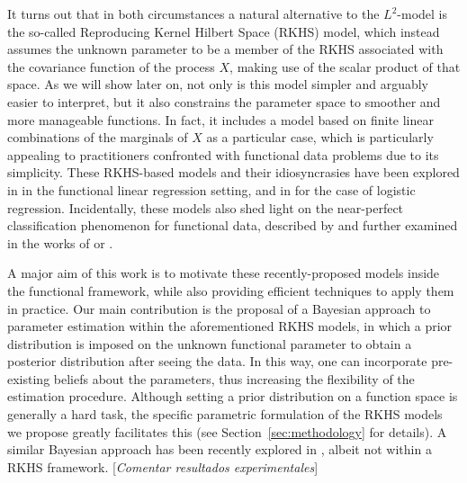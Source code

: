 \documentclass[ba]{imsart}
\numberwithin{equation}{section}
\theoremstyle{plain}
\newcommand\incomment[2][comment-red]{\color{#1}[\textit{#2}]\color{black}}
\begin{document}
It turns out that in both circumstances a natural alternative to the \(L^2\)-model is the so-called Reproducing Kernel Hilbert Space (RKHS) model, which instead assumes the unknown parameter to be a member of the RKHS associated with the covariance function of the process \(X\), making use of the scalar product of that space. As we will show later on, not only is this model simpler and arguably easier to interpret, but it also constrains the parameter space to smoother and more manageable functions. In fact, it includes a model based on finite linear combinations of the marginals of \(X\) as a particular case, which is particularly appealing to practitioners confronted with functional data problems due to its simplicity. These RKHS-based models and their idiosyncrasies have been explored in \citet{berrendero2019rkhs, berrendero2020general} in the functional linear regression setting, and in \citet{berrendero2018use, berrendero2021functional} for the case of logistic regression. Incidentally, these models also shed light on the near-perfect classification phenomenon for functional data, described by \citet{delaigle2012achieving} and further examined in the works of \citet{berrendero2018use} or \citet{torrecilla2020optimal}.

A major aim of this work is to motivate these recently-proposed models inside the functional framework, while also providing efficient techniques to apply them in practice. Our main contribution is the proposal of a Bayesian approach to parameter estimation within the aforementioned RKHS models, in which a prior distribution is imposed on the unknown functional parameter to obtain a posterior distribution after seeing the data. In this way, one can incorporate pre-existing beliefs about the parameters, thus increasing the flexibility of the estimation procedure. Although setting a prior distribution on a function space is generally a hard task, the specific parametric formulation of the RKHS models we propose greatly facilitates this (see Section~\ref{sec:methodology} for details). A similar Bayesian approach has been recently explored in \citet{grollemund2019bayesian}, albeit not within a RKHS framework. \incomment{Comentar resultados experimentales}
\end{document}
